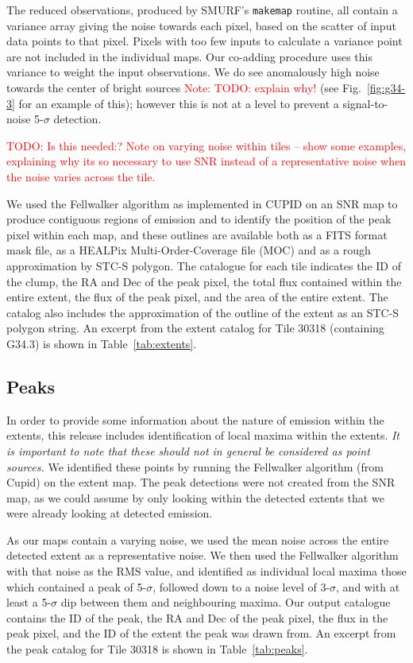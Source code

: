 \documentclass[twocolumn,times]{aastex6}
\newcommand{\todo}[1]{\textcolor{red}{TODO: #1}}
\newcommand{\note}[1]{\textcolor{red}{Note: #1}}
\begin{document}
The reduced observations, produced by SMURF's \texttt{makemap} routine, all
contain a variance array giving the noise towards each pixel, based on
the scatter of input data points to that pixel. Pixels with too few
inputs to calculate a variance point are not included in
the individual maps. Our co-adding procedure uses this variance to
weight the input observations. We do see anomalously high noise
towards the center of bright sources \note{TODO: explain why!} (see
Fig.~\ref{fig:g34-3} for an example of this); however this is not at a
level to prevent a signal-to-noise 5-$\sigma$ detection.

\todo{Is this needed:? Note on varying noise within tiles -- show some examples,
  explaining why its so necessary to use SNR instead of a
  representative noise when the noise varies across the tile.}

We used the Fellwalker algorithm as implemented in CUPID on an SNR map
to produce contiguous regions of emission and to identify the position
of the peak pixel within each map, and these outlines are available
both as a FITS format mask file, as a HEALPix Multi-Order-Coverage
file (MOC) and as a rough approximation by STC-S polygon. The
catalogue for each tile indicates the ID of the clump, the RA and Dec
of the peak pixel, the total flux contained within the entire extent,
the flux of the peak pixel, and the area of the entire extent. The
catalog also includes the approximation of the outline of the extent
as an STC-S polygon string. An excerpt from the extent catalog for
Tile 30318 (containing G34.3) is shown in Table~\ref{tab:extents}.







\subsection{Peaks}
\label{sec:peaks}
In order to provide some information about the nature of emission
within the extents, this release includes identification of local
maxima within the extents. \emph{It is important to note that these
  should not in general be considered as point sources.} We identified
these points by running the Fellwalker algorithm (from Cupid) on the
extent map. The peak detections were not created from the SNR map, as
we could assume by only looking within the detected extents that we
were already looking at detected emission.

As our maps contain a varying noise, we used the mean noise across the
entire detected extent as a representative noise. We then used the
Fellwalker algorithm with that noise as the RMS value, and identified
as individual local maxima those which contained a peak of 5-$\sigma$,
followed down to a noise level of 3-$\sigma$, and with at least a
5-$\sigma$ dip between them and neighbouring maxima. Our output
catalogue contains the ID of the peak, the RA and Dec of the peak
pixel, the flux in the peak pixel, and the ID of the extent the peak
was drawn from. An excerpt from the peak catalog for Tile 30318 is
shown in Table~\ref{tab:peaks}.
\end{document}
